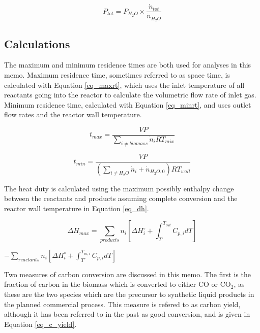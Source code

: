 \documentclass[11pt,twocolumn]{article}
\begin{document}
\begin{equation}
	P_{tot} = P_{H_2O} \times \frac{\dot{n}_{tot}}{\dot{n}_{H_2O}}
	\label{pressure}
\end{equation}


\subsection*{Calculations}

The maximum and minimum residence times are both used for analyses in this memo.  Maximum residence time, sometimes referred to as space time, is calculated with Equation \ref{eq_maxrt}, which uses the inlet temperature of all reactants going into the reactor to calculate the volumetric flow rate of inlet gas.  Minimum residence time, calculated with Equation \ref{eq_minrt}, and uses outlet flow rates and the reactor wall temperature.

\begin{equation}
	t_{max}= \frac{VP}{\sum_{i \ne biomass}\dot{n}_{i}RT_{mix}}
	\label{eq_maxrt}
\end{equation}

\begin{equation}
	t_{min} = \frac{VP}{(\sum_{i \ne H_{2}O}\dot{n}_{i}+\dot{n}_{H_{2}O,0})RT_{wall}}
	\label{eq_minrt}
\end{equation}

The heat duty is calculated using the maximum possibly enthalpy change between the reactants and products assuming complete conversion and the reactor wall temperature in Equation \ref{eq_dh}.

\begin{equation}
	\Delta H_{max} = \sum_{products}n_{i}\left[\Delta H_{i}^{\circ}+\int_{T^{\circ}}^{T_{out}}C_{p,i}dT\right] 
	\label{eq_dh}
\end{equation} 
\begin{center}
\begin{math}
 - \sum_{reactants}n_{i}\left[\Delta H_{i}^{\circ}+\int_{T^{\circ}}^{T_{in,i}}C_{p,i}dT\right]
\end{math}
\end{center}

Two measures of carbon conversion are discussed in this memo.  The first is the fraction of carbon in the biomass which is converted to either CO or CO$_2$, as these are the two species which are the precursor to synthetic liquid products in the planned commercial process.  This measure is refered to as carbon yield, although it has been referred to in the past as good conversion, and is given in Equation \ref{eq_c_yield}.
\end{document}
